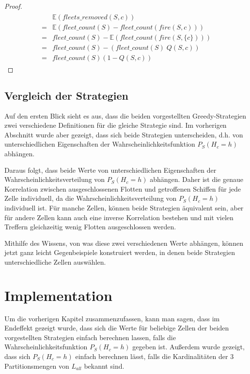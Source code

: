 \documentclass[a4paper,12pt]{llncs}
\numberwithin{equation}{section}
\begin{document}
\begin{proof}
\begin{align}
\begin{split}
&\mathds{E}(fleets\_removed(S,c))\\
=&\mathds{E}(fleet\_count(S) - fleet\_count(fire(S,c)))\\
=&fleet\_count(S) - \mathds{E}(fleet\_count(fire(S,\{c\})))\\
=&fleet\_count(S) - (fleet\_count(S)\; Q(S,c))\\
=&fleet\_count(S) (1 - Q(S,c))
\end{split}
\end{align}
\end{proof}

\subsection{Vergleich der Strategien}
Auf den ersten Blick sieht es aus, dass die beiden vorgestellten Greedy-Strategien zwei verschiedene Definitionen für die gleiche Strategie sind. Im vorherigen Abschnitt wurde aber gezeigt, dass sich beide Strategien unterscheiden, d.h. von unterschiedlichen Eigenschaften der Wahrscheinlichkeitsfunktion $P_S(H_{c} = h)$ abhängen.

Daraus folgt, dass beide Werte von unterschiedlichen Eigenschaften der Wahrscheinlichkeitsverteilung von $P_S(H_{c} = h)$ abhängen. Daher ist die genaue Korrelation zwischen ausgeschlossenen Flotten und getroffenen Schiffen für jede Zelle individuell, da die Wahrscheinlichkeitsverteilung von $P_S(H_{c} = h)$ individuell ist. Für manche Zellen, können beide Strategien äquivalent sein, aber für andere Zellen kann auch eine inverse Korrelation bestehen und mit vielen Treffern gleichzeitig wenig Flotten ausgeschlossen werden.

Mithilfe des Wissens, von was diese zwei verschiedenen Werte abhängen, können jetzt ganz leicht Gegenbeispiele konstruiert werden, in denen beide Strategien unterschiedliche Zellen auswählen.

\section{Implementation}

Um die vorherigen Kapitel zusammenzufassen, kann man sagen, dass im Endeffekt gezeigt wurde, dass sich die Werte für beliebige Zellen der beiden vorgestellten Strategien einfach berechnen lassen, falls die Wahrscheinlichkeitsfunktion $P_S(H_{c} = h)$ gegeben ist. Außerdem wurde gezeigt, dass sich $P_S(H_{c} = h)$ einfach berechnen lässt, falls die Kardinalitäten der 3 Partitionsmengen von $L_{all}$ bekannt sind.
\end{document}
